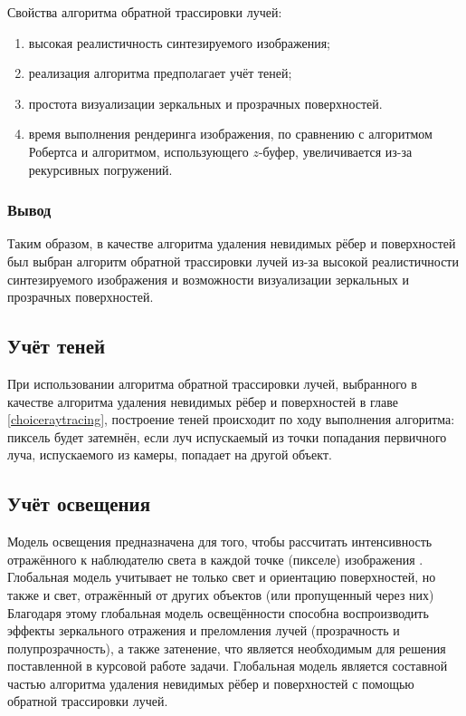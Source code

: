 Свойства алгоритма обратной трассировки лучей:
\begin{enumerate}[label=\arabic*)]
	\item высокая реалистичность синтезируемого изображения;
	\item реализация алгоритма предполагает учёт теней;
	\item простота визуализации зеркальных и прозрачных поверхностей.
	\item время выполнения рендеринга изображения, по сравнению с алгоритмом Робертса и алгоритмом, использующего $z$-буфер, увеличивается из-за рекурсивных погружений.
\end{enumerate}

\subsubsection{Вывод}

Таким образом, в качестве алгоритма удаления невидимых рёбер и поверхностей был выбран алгоритм обратной трассировки лучей из-за высокой реалистичности синтезируемого изображения и возможности визуализации зеркальных и прозрачных поверхностей.

\subsection{Учёт теней}

При использовании алгоритма обратной трассировки лучей, выбранного в качестве алгоритма удаления невидимых рёбер и поверхностей в главе \ref{choiceraytracing}, построение теней происходит по ходу выполнения алгоритма: пиксель будет затемнён, если луч испускаемый из точки попадания первичного луча, испускаемого из камеры, попадает на другой объект.

\subsection{Учёт освещения}

Модель освещения предназначена для того, чтобы рассчитать интенсивность отражённого к наблюдателю света в каждой точке (пикселе) изображения \cite{rodgers}.  Глобальная модель учитывает не только свет и ориентацию поверхностей, но также и свет, отражённый от других объектов (или пропущенный через них) Благодаря этому глобальная модель освещённости способна воспроизводить эффекты зеркального отражения и преломления лучей (прозрачность и полупрозрачность), а также затенение, что является необходимым для решения поставленной в курсовой работе задачи. Глобальная модель является составной частью алгоритма удаления невидимых рёбер и поверхностей с помощью обратной трассировки лучей.


